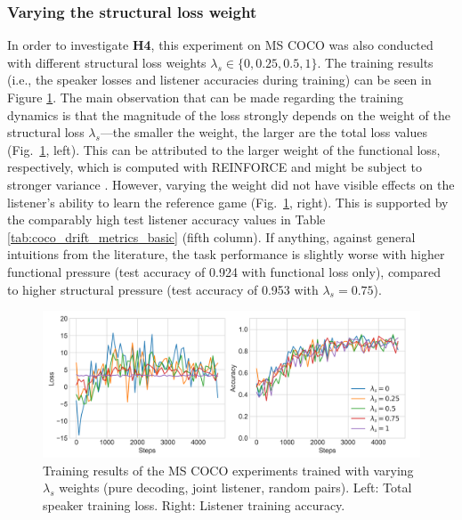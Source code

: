 \subsubsection{Varying the structural loss weight}
In order to investigate \textbf{H4}, this experiment on MS COCO was also conducted with different structural loss weights $\lambda_s \in \{0, 0.25, 0.5, 1\}$. The training results (i.e., the speaker losses and listener accuracies during training) can be seen in Figure \ref{fig:coco_baseline_speaker_loss_listener_acc_all}. The main observation that can be made regarding the training dynamics is that the magnitude of the loss strongly depends on the weight of the structural loss $\lambda_s$---the smaller the weight, the larger are the total loss values (Fig.~\ref{fig:coco_baseline_speaker_loss_listener_acc_all}, left). This can be attributed to the larger weight of the functional loss, respectively, which is computed with REINFORCE and might be subject to stronger variance \parencite[cf.][]{havrylov2017emergence}. However, varying the weight did not have visible effects on the listener's ability to learn the reference game (Fig.~\ref{fig:coco_baseline_speaker_loss_listener_acc_all}, right). 
This is supported by the comparably high test listener accuracy values in Table \ref{tab:coco_drift_metrics_basic} (fifth column). If anything, against general intuitions from the literature, the task performance is slightly worse with higher functional pressure (test accuracy of 0.924 with functional loss only), compared to higher structural pressure (test accuracy of 0.953 with $\lambda_s = 0.75$).%
\begin{figure}[h]
	\centering
	\includegraphics[width=\linewidth]{images/coco_refgame_4000_pure_all_Ls_random.png}
	\caption{Training results of the MS COCO experiments trained with varying $\lambda_s$ weights (pure decoding, joint listener, random pairs). Left: Total speaker training loss. Right: Listener training accuracy.}
	\label{fig:coco_baseline_speaker_loss_listener_acc_all}
\end{figure}

